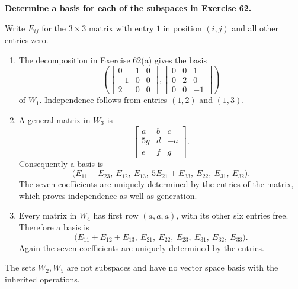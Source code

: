 \providecommand{\rank}{\operatorname{r}}
\providecommand{\RR}{\mathbb R}
\providecommand{\CC}{\mathbb C}
\providecommand{\KK}{\mathbb K}

\setcounter{enumi}{80}
\item {\bfseries\boldmath
Determine a basis for each of the subspaces in Exercise 62.
}

\begin{answer}
Write $E_{ij}$ for the $3\times3$ matrix with entry $1$ in position $(i,j)$
and all other entries zero.
\begin{enumerate}
\item[$\mathbf{(a)}$] The decomposition in Exercise 62(a) gives the basis
\[
 \left(\begin{bmatrix}0&1&0\\-1&0&0\\2&0&0\end{bmatrix},
       \begin{bmatrix}0&0&1\\0&2&0\\0&0&-1\end{bmatrix}\right)
\]
of $W_1$. Independence follows from entries $(1,2)$ and $(1,3)$.
\item[$\mathbf{(c)}$] A general matrix in $W_3$ is
\[
 \begin{bmatrix}a&b&c\\5g&d&-a\\e&f&g\end{bmatrix}.
\]
Consequently a basis is
\[
 \bigl(E_{11}-E_{23},\ E_{12},\ E_{13},\ 5E_{21}+E_{33},\ E_{22},\ E_{31},\ E_{32}\bigr).
\]
The seven coefficients are uniquely determined by the entries of the matrix,
which proves independence as well as generation.
\item[$\mathbf{(d)}$] Every matrix in $W_4$ has first row $(a,a,a)$, with
its other six entries free. Therefore a basis is
\[
 \bigl(E_{11}+E_{12}+E_{13},\ E_{21},\ E_{22},\ E_{23},\ E_{31},\ E_{32},\ E_{33}\bigr).
\]
Again the seven coefficients are uniquely determined by the entries.
\end{enumerate}
The sets $W_2,W_5$ are not subspaces and have no vector space basis with the
inherited operations.
\end{answer}
